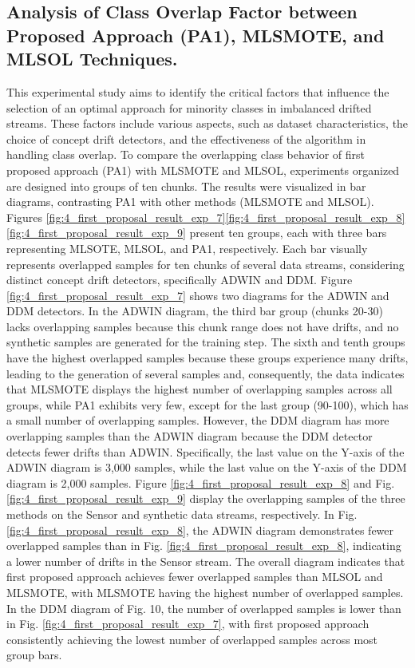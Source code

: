 \subsection{Analysis of Class Overlap Factor between Proposed Approach (PA1), MLSMOTE, and MLSOL Techniques.}
This experimental study aims to identify the critical factors that influence the selection of an optimal approach for minority classes in imbalanced drifted streams. These factors include various aspects, such as dataset characteristics, the choice of concept drift detectors, and the effectiveness of the algorithm in handling class overlap. To compare the overlapping class behavior of first proposed approach (PA1) with MLSMOTE and MLSOL, experiments organized are designed into groups of ten chunks. The results were visualized in bar diagrams, contrasting PA1 with other methods (MLSMOTE and MLSOL). Figures \ref{fig:4_first_proposal_result_exp_7}\ref{fig:4_first_proposal_result_exp_8}\ref{fig:4_first_proposal_result_exp_9} present ten groups, each with three bars representing MLSOTE, MLSOL, and PA1, respectively. Each bar visually represents overlapped samples for ten chunks of several data streams, considering distinct concept drift detectors, specifically ADWIN and DDM.
Figure \ref{fig:4_first_proposal_result_exp_7} shows two diagrams for the ADWIN and DDM detectors. In the ADWIN diagram, the third bar group (chunks 20-30) lacks overlapping samples because this chunk range does not have drifts, and no synthetic samples are generated for the training step. The sixth and tenth groups have the highest overlapped samples because these groups experience many drifts, leading to the generation of several samples and, consequently, the data indicates that MLSMOTE displays the highest number of overlapping samples across all groups, while PA1 exhibits very few, except for the last group (90-100), which has a small number of overlapping samples. However, the DDM diagram has more overlapping samples than the ADWIN diagram because the DDM detector detects fewer drifts than ADWIN. Specifically, the last value on the Y-axis of the ADWIN diagram is 3,000 samples, while the last value on the Y-axis of the DDM diagram is 2,000 samples. Figure \ref{fig:4_first_proposal_result_exp_8} and Fig. \ref{fig:4_first_proposal_result_exp_9} display the overlapping samples of the three methods on the Sensor and synthetic data streams, respectively. In Fig. \ref{fig:4_first_proposal_result_exp_8}, the ADWIN diagram demonstrates fewer overlapped samples than in Fig. \ref{fig:4_first_proposal_result_exp_8}, indicating a lower number of drifts in the Sensor stream. The overall diagram indicates that first proposed approach achieves fewer overlapped samples than MLSOL and MLSMOTE, with MLSMOTE having the highest number of overlapped samples. In the DDM diagram of Fig. 10, the number of overlapped samples is lower than in Fig. \ref{fig:4_first_proposal_result_exp_7}, with first proposed approach consistently achieving the lowest number of overlapped samples across most group bars.
